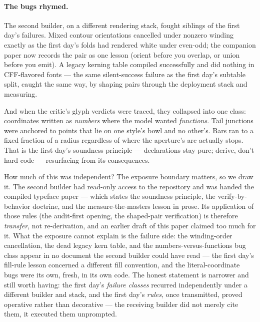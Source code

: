 \documentclass[12pt]{article}
\begin{document}
\paragraph{The bugs rhymed.} The second builder, on a different rendering stack, fought siblings of the first day's failures. Mixed contour orientations cancelled under nonzero winding exactly as the first day's folds had rendered white under even-odd; the companion paper now records the pair as one lesson (orient before you overlap, or union before you emit). A legacy kerning table compiled successfully and did nothing in CFF-flavored fonts — the same silent-success failure as the first day's subtable split, caught the same way, by shaping pairs through the deployment stack and measuring.

And when the critic's glyph verdicts were traced, they collapsed into one class: coordinates written as \emph{numbers} where the model wanted \emph{functions}. Tail junctions were anchored to points that lie on one style's bowl and no other's. Bars ran to a fixed fraction of a radius regardless of where the aperture's arc actually stops. That is the first day's soundness principle — declarations stay pure; derive, don't hard-code — resurfacing from its consequences.

How much of this was independent? The exposure boundary matters, so we draw it. The second builder had read-only access to the repository and was handed the compiled typeface paper — which states the soundness principle, the verify-by-behavior doctrine, and the measure-the-masters lesson in prose. Its application of those rules (the audit-first opening, the shaped-pair verification) is therefore \emph{transfer}, not re-derivation, and an earlier draft of this paper claimed too much for it. What the exposure cannot explain is the failure side: the winding-order cancellation, the dead legacy kern table, and the numbers-versus-functions bug class appear in no document the second builder could have read — the first day's fill-rule lesson concerned a different fill convention, and the literal-coordinate bugs were its own, fresh, in its own code. The honest statement is narrower and still worth having: the first day's \emph{failure classes} recurred independently under a different builder and stack, and the first day's \emph{rules}, once transmitted, proved operative rather than decorative — the receiving builder did not merely cite them, it executed them unprompted.
\end{document}
